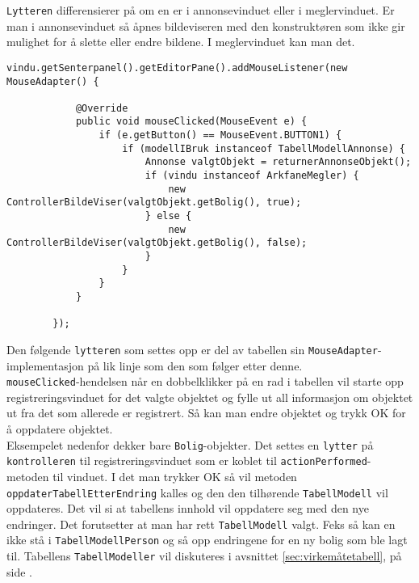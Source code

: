 \texttt{Lytteren} differensierer på om en er i annonsevinduet eller i meglervinduet. Er man i annonsevinduet så åpnes bildeviseren med den konstruktøren som ikke gir mulighet for å slette eller endre bildene. I meglervinduet kan man det.

\begin{lstlisting}[caption=\texttt{Lytter} for museklikk i output-vinduet]
        vindu.getSenterpanel().getEditorPane().addMouseListener(new MouseAdapter() {

            @Override
            public void mouseClicked(MouseEvent e) {
                if (e.getButton() == MouseEvent.BUTTON1) {
                    if (modellIBruk instanceof TabellModellAnnonse) {
                        Annonse valgtObjekt = returnerAnnonseObjekt();
                        if (vindu instanceof ArkfaneMegler) {
                            new ControllerBildeViser(valgtObjekt.getBolig(), true);
                        } else {
                            new ControllerBildeViser(valgtObjekt.getBolig(), false);
                        }
                    }
                }
            }

        });

\end{lstlisting}


Den følgende \texttt{lytteren} som settes opp er del av tabellen sin \texttt{MouseAdapter}-implementasjon på lik linje som den som følger etter denne. \\
\texttt{mouseClicked}-hendelsen når en dobbelklikker på en rad i tabellen vil starte opp registreringsvinduet for det valgte objektet og fylle ut all informasjon om objektet ut fra det som allerede er registrert. Så kan man endre objektet og trykk OK for å oppdatere objektet. \\
Eksempelet nedenfor dekker bare \texttt{Bolig}-objekter. Det settes en \texttt{lytter} på \texttt{kontrolleren} til registreringsvinduet som er koblet til \texttt{actionPerformed}-metoden til vinduet. I det man trykker OK så vil metoden \texttt{oppdaterTabellEtterEndring} kalles og den den tilhørende \texttt{TabellModell} vil oppdateres. Det vil si at tabellens innhold vil oppdatere seg med den nye endringer. Det forutsetter at man har rett \texttt{TabellModell} valgt. Feks så kan en ikke stå i \texttt{TabellModellPerson} og så opp endringene for en ny bolig som ble lagt til. 
Tabellens \texttt{TabellModeller} vil diskuteres i avsnittet \ref{sec:virkemåtetabell}, på side \pageref{sec:virkemåtetabell}.

